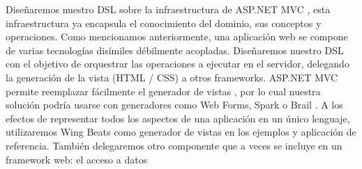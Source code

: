 \documentclass[12pt]{report}
\begin{document}
Diseñaremos nuestro DSL sobre la infraestructura de ASP.NET MVC \cite{mvc}, esta infraestructura ya encapsula el conocimiento del dominio, sus conceptos y operaciones. 
Como mencionamos anteriormente, una aplicación web se compone de varias tecnologías disímiles débilmente acopladas. Diseñaremos nuestro DSL con el objetivo de orquestrar las operaciones a ejecutar en el servidor, delegando la generación de la vista (HTML / CSS) a otros frameworks. ASP.NET MVC permite reemplazar fácilmente el generador de vistas \cite{mvcrender}, por lo cual nuestra solución podría usarse con generadores como Web Forms, Spark \cite{spark} o Brail \cite{brail}. A los efectos de representar todos los aspectos de una aplicación en un único lenguaje, utilizaremos Wing Beats \cite{wingbeats} como generador de vistas en los ejemplos y aplicación de referencia.
También delegaremos otro componente que a veces se incluye en un framework web: el acceso a datos



\end{document}
